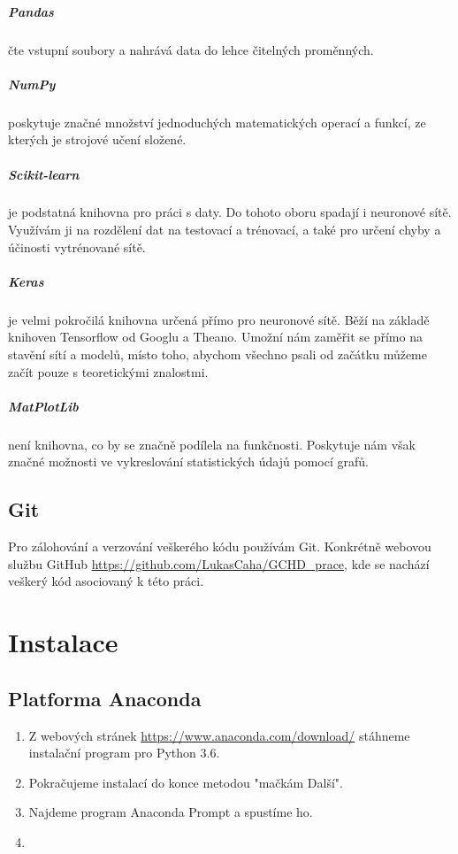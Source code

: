 \documentclass[12pt,a4paper]{report}
\begin{document}
			\paragraph{Pandas}
			čte vstupní soubory a nahrává data do lehce čitelných proměnných.
			\paragraph{NumPy}
			poskytuje značné množství jednoduchých matematických operací a funkcí, ze kterých je strojové učení složené.
			\paragraph{Scikit-learn}
			je podstatná knihovna pro práci s daty. Do tohoto oboru spadají i neuronové sítě. Využívám ji na rozdělení dat na testovací a trénovací, a také pro určení chyby a účinosti vytrénované sítě.
			\paragraph{Keras}
			je velmi pokročilá knihovna určená přímo pro neuronové sítě. Běží na základě knihoven Tensorflow od Googlu a Theano. Umožní nám zaměřit se přímo na stavění sítí a modelů, místo toho, abychom všechno psali od začátku můžeme začít pouze s teoretickými znalostmi.
			\paragraph{MatPlotLib}
			není knihovna, co by se značně podílela na funkčnosti. Poskytuje nám však značné možnosti ve vykreslování statistických údajů pomocí grafů.
	\section{Git}
		Pro zálohování a verzování veškerého kódu používám Git. Konkrétně webovou službu GitHub \url{https://github.com/LukasCaha/GCHD_prace}, kde se nachází veškerý kód asociovaný k této práci.
		
\chapter{Instalace}
	\section{Platforma Anaconda}
	\begin{enumerate}
		\item Z webových stránek \url{https://www.anaconda.com/download/} stáhneme instalační program pro Python 3.6.
		\item Pokračujeme instalací do konce metodou "mačkám Další".
		\item Najdeme program Anaconda Prompt a spustíme ho.
		\item 
	\end{enumerate}
	
\end{document}

